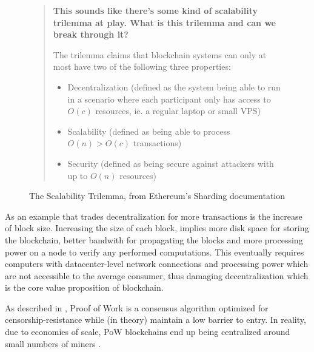 \begin{figure}[H]
\begin{quote}
    \textbf{This sounds like there’s some kind of scalability trilemma at play. What is this trilemma and can we break through it?}

    The trilemma claims that blockchain systems can only at most have two of the following three properties:

    \begin{itemize}
        \item Decentralization (defined as the system being able to run in a scenario where each participant only has access to $O(c)$ resources, ie. a regular laptop or small VPS)
        \item Scalability (defined as being able to process $O(n) > O(c)$ transactions)
        \item Security (defined as being secure against attackers with up to $O(n)$ resources)
    \end{itemize}
\end{quote}
\label{fig:trilemma}
\caption{The Scalability Trilemma, from Ethereum's Sharding documentation \cite{sharding}}
\end{figure}

As an example that trades decentralization for more transactions is the increase of block size. Increasing the size of each block, implies more disk space for storing the blockchain, better bandwith for propagating the blocks and more processing power on a node to verify any performed computations. This eventually requires computers with datacenter-level network connections and processing power which are not accessible to the average consumer, thus damaging decentralization which is the core value proposition of blockchain. %

As described in \cite{scaling-trustless-models}, Proof of Work is a consensus algorithm optimized for censorship-resistance while (in theory) maintain a low barrier to entry. In reality, due to economies of scale, PoW blockchains end up being centralized around small numbers of miners \cite{Gencer2018DecentralizationIB}. 

